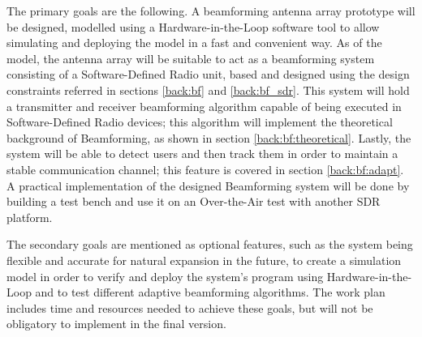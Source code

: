 \documentclass[12pt,a4paper]{report}
\begin{document}
The primary goals are the following. A beamforming antenna array prototype will be designed, modelled using a Hardware-in-the-Loop software tool to allow simulating and deploying the model in a fast and convenient way. As of the model, the antenna array will be suitable to act as a beamforming system consisting of a Software-Defined Radio unit, based and designed using the design constraints referred in sections \ref{back:bf} and \ref{back:bf_sdr}. This system will hold a transmitter and receiver beamforming algorithm capable of being executed in Software-Defined Radio devices; this algorithm will implement the theoretical background of Beamforming, as shown in section \ref{back:bf:theoretical}. Lastly, the system will be able to detect users and then track them in order to maintain a stable communication channel; this feature is covered in section \ref{back:bf:adapt}. A practical implementation of the designed Beamforming system will be done by building a test bench and use it on an Over-the-Air test with another SDR platform.

The secondary goals are mentioned as optional features, such as the system being flexible and accurate for natural expansion in the future, to create a simulation model in order to verify and deploy the system's program using Hardware-in-the-Loop and to test different adaptive beamforming algorithms. The work plan includes time and resources needed to achieve these goals, but will not be obligatory to implement in the final version.

\end{document}
